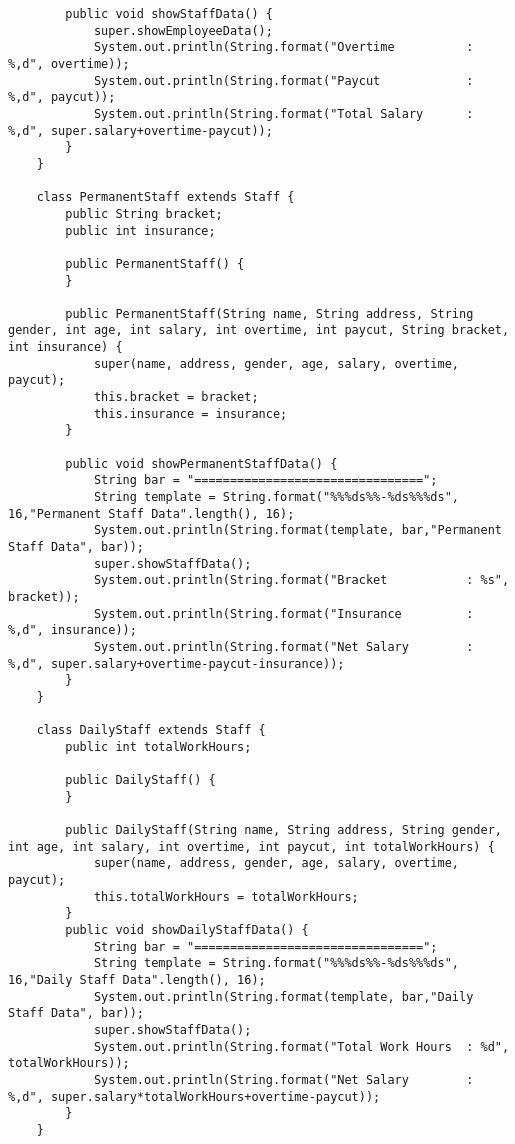 \documentclass[12pt,titlepage]{article}
\begin{document}
\begin{verbatim}
        public void showStaffData() {
            super.showEmployeeData();
            System.out.println(String.format("Overtime          : %,d", overtime));
            System.out.println(String.format("Paycut            : %,d", paycut));
            System.out.println(String.format("Total Salary      : %,d", super.salary+overtime-paycut));
        }
    }

    class PermanentStaff extends Staff {
        public String bracket;
        public int insurance;
        
        public PermanentStaff() {
        }
        
        public PermanentStaff(String name, String address, String gender, int age, int salary, int overtime, int paycut, String bracket, int insurance) {
            super(name, address, gender, age, salary, overtime, paycut);
            this.bracket = bracket;
            this.insurance = insurance;
        }
        
        public void showPermanentStaffData() {
            String bar = "================================";
            String template = String.format("%%%ds%%-%ds%%%ds", 16,"Permanent Staff Data".length(), 16);
            System.out.println(String.format(template, bar,"Permanent Staff Data", bar));
            super.showStaffData();
            System.out.println(String.format("Bracket           : %s", bracket));
            System.out.println(String.format("Insurance         : %,d", insurance));
            System.out.println(String.format("Net Salary        : %,d", super.salary+overtime-paycut-insurance));
        }
    }

    class DailyStaff extends Staff {
        public int totalWorkHours;

        public DailyStaff() {
        }

        public DailyStaff(String name, String address, String gender, int age, int salary, int overtime, int paycut, int totalWorkHours) {
            super(name, address, gender, age, salary, overtime, paycut);
            this.totalWorkHours = totalWorkHours;
        }
        public void showDailyStaffData() {
            String bar = "================================";
            String template = String.format("%%%ds%%-%ds%%%ds", 16,"Daily Staff Data".length(), 16);
            System.out.println(String.format(template, bar,"Daily Staff Data", bar));
            super.showStaffData();
            System.out.println(String.format("Total Work Hours  : %d", totalWorkHours));
            System.out.println(String.format("Net Salary        : %,d", super.salary*totalWorkHours+overtime-paycut));
        }
    }
\end{verbatim}
\end{document}
